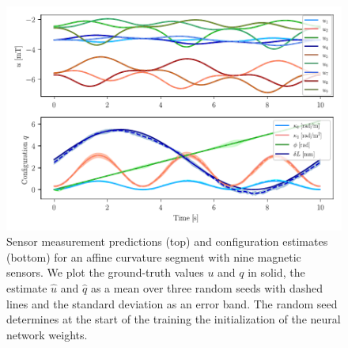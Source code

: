 \begin{figure}[hbt]
  \centering
  \includegraphics[width=1.0\columnwidth]{promasens/figures/simulation_results/ac/affine_curvature_inference_v2_cropped.pdf}
  \caption{Sensor measurement predictions (top) and configuration estimates (bottom) for an affine curvature segment with nine magnetic sensors. We plot the ground-truth values $u$ and $q$ in solid, the estimate $\hat{u}$ and $\hat{q}$ as a mean over three random seeds with dashed lines and the standard deviation as an error band. The random seed determines at the start of the training the initialization of the neural network weights.}
  \label{fig:promasens:ac_simulations:inference_plot}
\end{figure}


